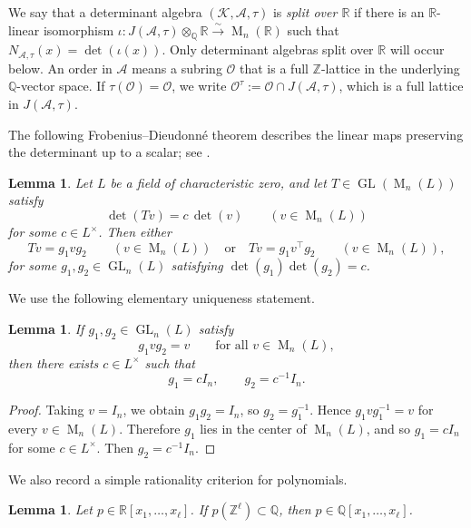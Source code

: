 \documentclass[reqno,11pt]{amsart}
\numberwithin{equation}{section}
\newtheorem{lemma}[theorem]{Lemma}
\theoremstyle{definition}
\theoremstyle{remark}
\newcommand{\op}{\operatorname}
\newcommand{\M}{\op{M}}
\newcommand{\GL}{\op{GL}}
\begin{document}
We say that a determinant algebra $(\mathscr{K},\mathscr{A},\tau)$ is \emph{split over
$\mathbb R$} if there is an $\mathbb R$-linear isomorphism
$\iota:J(\mathscr{A},\tau)\otimes_{\mathbb Q}\mathbb R
    \xrightarrow{\sim}
    \M_n(\mathbb R)$
such that $ N_{\mathscr{A},\tau}(x)=\det(\iota(x))$.
Only determinant algebras split over $\mathbb R$ will occur below. An order in $\mathscr{A}$ means a subring $\mathcal O$ that is a full
$\mathbb Z$-lattice in the underlying $\mathbb Q$-vector space. If
$\tau(\mathcal O)=\mathcal O$, we write
$ \mathcal O^\tau:=\mathcal O\cap J(\mathscr{A},\tau)$, which
 is a full lattice in $J(\mathscr{A},\tau)$.



The following Frobenius--Dieudonn\'e theorem describes the linear maps
preserving the determinant up to a scalar; see \cite[Theorem~2]{MarcusMoyls}.

\begin{lemma}
\label{Fro}
Let $L$ be a field of characteristic zero, and let
$T\in\GL(\M_n(L))$ satisfy
$$
    \det(Tv)=c\,\det(v)
    \qquad
    (v\in\M_n(L))
$$
for some $c\in L^\times$. Then either
$$
    Tv=g_1vg_2
    \qquad
    (v\in\M_n(L))\quad\text{or}\quad 
    Tv=g_1v^{\intercal}g_2
    \qquad
    (v\in\M_n(L)),
$$
for some $g_1,g_2\in\GL_n(L)$ satisfying $\det(g_1)\det(g_2)=c$.
\end{lemma}


We use the following elementary uniqueness statement.

\begin{lemma}
\label{commute}
If $g_1,g_2\in\GL_n(L)$ satisfy
$$
    g_1vg_2=v
    \qquad
    \text{for all }v\in\M_n(L),
$$
then there exists $c\in L^\times$ such that
$$
    g_1=cI_n,
    \qquad
    g_2=c^{-1}I_n.
$$
\end{lemma}

\begin{proof}
Taking $v=I_n$, we obtain $g_1g_2=I_n$, so $g_2=g_1^{-1}$. Hence
$g_1vg_1^{-1}=v$ for every $v\in\M_n(L)$. Therefore $g_1$ lies in
the center of $\M_n(L)$, and so $g_1=cI_n$ for some $c\in L^\times$.
Then $g_2=c^{-1}I_n$.
\end{proof}

We also record a simple rationality criterion for polynomials.

\begin{lemma}
\label{polynomial}
Let $p\in\mathbb R[x_1,\dots,x_\ell]$. If $p(\mathbb Z^\ell)\subset\mathbb Q$,
then $p\in\mathbb Q[x_1,\dots,x_\ell]$.
\end{lemma}
\end{document}
